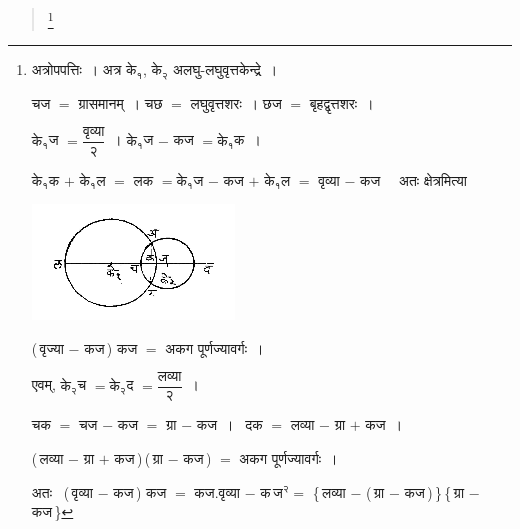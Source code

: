 \documentclass[11pt, openany]{book}
\begin{document}
\begin{quote}
    \bs 
 \footnote{अत्रोपपत्तिः~। अत्र $\mbox{के}_{\text{१}}$, $\mbox{के}_{\text{२}}$ अलघु-लघुवृत्तकेन्द्रे~।
\vspace{1mm}

\hspace{2mm} चज $=$ ग्रासमानम्~। चछ $=$ लघुवृत्तशरः~। छज $=$ बृहद्वृत्तशरः~।
\vspace{1mm}

\hspace{2mm} $\mbox{के}_{\text{१}}$ज $= \dfrac{\mbox{वृव्या}}{\mbox{२}}$~। $\mbox{के}_{\text{१}}$ज $-$ कज $= \mbox{के}_{\text{१}}$क~।
\vspace{1mm}

\hspace{2mm} $\mbox{के}_{\text{१}}$क $+$
$\mbox{के}_{\text{१}}$ल $=$
लक $= \mbox{के}_{\text{१}}$ज $-$ कज $+$ $\mbox{के}_{\text{१}}$ल $=$ वृव्या $-$ कज~~ अतः क्षेत्रमित्या
\vspace{-4mm}

\begin{center}
    \includegraphics[scale=.8]{graphics/capture80.png}
\end{center}
\vspace{-2mm}

\hspace{2mm} (\,वृज्या $-$ कज\,) कज $=$ अकग पूर्णज्यावर्गः~।
\vspace{1mm}

\hspace{4mm} एवम्, $\mbox{के}_{\text{२}}$च $= \mbox{के}_{\text{२}}$द $= \dfrac{\mbox{लव्या}}{\mbox{२}}$~।
\vspace{1mm}

\hspace{4mm} चक $=$ चज $-$ कज $=$ ग्रा $-$ कज~।~ दक $=$ लव्या $-$ ग्रा $+$ कज~।
\vspace{1mm}

\hspace{4mm} (\,लव्या $-$ ग्रा $+$ कज\,)\,(\,ग्रा $-$ कज\,) $=$ अकग पूर्णज्यावर्गः~। 
\vspace{1mm}

\hspace{2mm} अतः~ (\,वृव्या $-$ कज\,) कज $=$ कज.वृव्या $-$ क\,$\mbox{ज}^{\text{२}} =$ \{\,लव्या $-$ (\,ग्रा $-$ कज\,)\,\}\,\{\,ग्रा $-$ कज\,\}
\vspace{1mm}

}
\end{quote}
\end{document}
